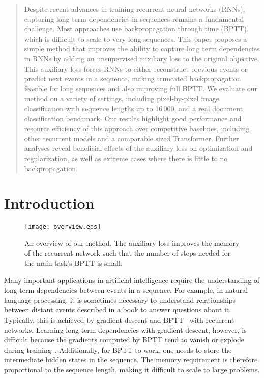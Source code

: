 \documentclass{article}
\begin{document}
\begin{abstract}
Despite recent advances in training recurrent neural networks (RNNs), capturing long-term dependencies in sequences remains a fundamental challenge.
Most approaches use backpropagation through time (BPTT), which is difficult to scale to very long sequences. 
This paper proposes a simple method that improves the ability to capture long term dependencies in RNNs by adding an unsupervised auxiliary loss to the original objective. 
This auxiliary loss forces RNNs to either reconstruct previous events or predict next events in a sequence, making truncated backpropagation feasible for long sequences and also improving full BPTT. 
We evaluate our method on a variety of settings, including pixel-by-pixel image classification with sequence lengths up to 16\,000, and a real document classification benchmark. 
Our results highlight good performance and resource efficiency of this approach over competitive baselines, including other recurrent models and a comparable sized Transformer. 
Further analyses reveal beneficial effects of the auxiliary loss on optimization and regularization, as well as extreme cases where there is little to no backpropagation. 
\end{abstract}

\section{Introduction}

\begin{figure}[t!]
\centering
\texttt{[image: overview.eps]}
\caption{An overview of our method. The auxiliary loss improves the memory of the recurrent network such that the number of steps needed for the main task's BPTT is small.}
\label{fig:overview}
\end{figure}
Many important applications in artificial intelligence require the understanding of long term dependencies between events in a sequence. For example, in natural language processing, it is sometimes necessary to understand relationships between distant events described in a book to answer questions about it. Typically, this is achieved by gradient descent and BPTT~\cite{Rumelhart86} with recurrent networks. Learning long term dependencies with gradient descent, however, is difficult because the gradients computed by BPTT tend to vanish or explode during training~\cite{hochreiter2001gradient}. Additionally, for BPTT to work, one needs to store the intermediate hidden states in the sequence. The memory requirement is therefore proportional to the sequence length, making it difficult to scale to large problems.
\end{document}
